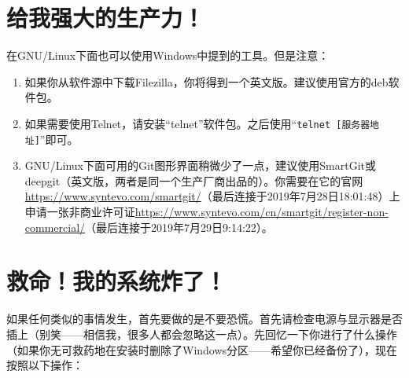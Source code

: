 \section{给我强大的生产力！}
在GNU/Linux下面也可以使用Windows中提到的工具。但是注意：
\begin{enumerate}
	\item 如果你从软件源中下载Filezilla，你将得到一个英文版。建议使用官方的deb软件包。
	\item 如果需要使用Telnet，请安装“telnet”软件包。之后使用“\verb|telnet [服务器地址]|”即可。
	\item GNU/Linux下面可用的Git图形界面稍微少了一点，建议使用SmartGit或deepgit（英文版，两者是同一个生产厂商出品的）。你需要在它的官网\url{https://www.syntevo.com/smartgit/}（最后连接于2019年7月28日18:01:48）上申请一张非商业许可证\url{https://www.syntevo.com/cn/smartgit/register-non-commercial/}（最后连接于2019年7月29日9:14:22）。
\end{enumerate}
\section{救命！我的系统炸了！}
如果任何类似的事情发生，首先要做的是不要恐慌。首先请检查电源与显示器是否插上（别笑——相信我，很多人都会忽略这一点）。先回忆一下你进行了什么操作（如果你无可救药地在安装时删除了Windows分区——希望你已经备份了），现在按照以下操作：
